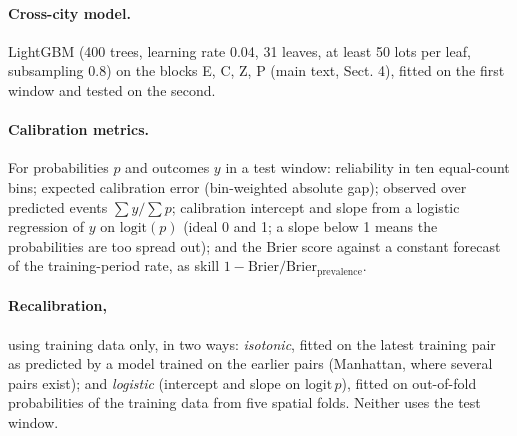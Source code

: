 \documentclass[10pt]{article}
\begin{document}
\paragraph{Cross-city model.} LightGBM (400 trees, learning rate 0.04, 31 leaves, at least 50 lots per leaf,
subsampling 0.8) on the blocks E, C, Z, P (main text, Sect. 4), fitted on the first window and tested on the second.

\paragraph{Calibration metrics.} For probabilities $p$ and outcomes $y$ in a test window: reliability in ten
equal-count bins; expected calibration error (bin-weighted absolute gap); observed over predicted events
$\sum y/\sum p$; calibration intercept and slope from a logistic regression of $y$ on $\mathrm{logit}(p)$ (ideal 0 and
1; a slope below 1 means the probabilities are too spread out); and the Brier score against a constant forecast of the
training-period rate, as skill $1 - \mathrm{Brier}/\mathrm{Brier}_\mathrm{prevalence}$.

\paragraph{Recalibration,} using training data only, in two ways: \emph{isotonic}, fitted on the latest training pair
as predicted by a model trained on the earlier pairs (Manhattan, where several pairs exist); and \emph{logistic}
(intercept and slope on $\mathrm{logit}\,p$), fitted on out-of-fold probabilities of the training data from five
spatial folds. Neither uses the test window.
\end{document}
